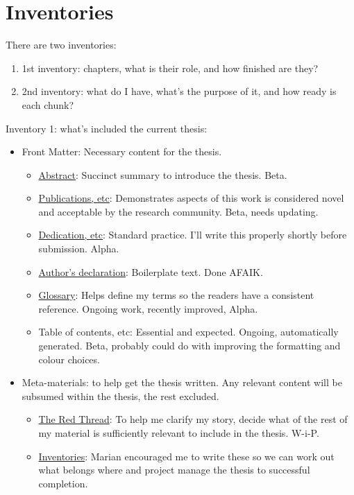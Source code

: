\section{Inventories}
\label{section_inventories}
There are two inventories:
\begin{enumerate}
    \item 1st inventory: chapters, what is their role, and how finished are they?
    \item 2nd inventory: what do I have, what's the purpose of it, and how ready is each chunk?
\end{enumerate}

Inventory 1: what's included the current thesis:
\begin{itemize}
    \item Front Matter: Necessary content for the thesis.
    \begin{itemize}
        \item \href{the-abstract}{Abstract}: Succinct summary to introduce the thesis. Beta.
        \item \href{section-publications}{Publications, etc}: Demonstrates aspects of this work is considered novel and acceptable by the research community. Beta, needs updating.
        \item \href{the-dedication}{Dedication, etc}: Standard practice. I'll write this properly shortly before submission. Alpha.
        \item \href{the-declaration}{Author's declaration}: Boilerplate text. Done AFAIK.
        \item \href{the-glossary}{Glossary}: Helps define my terms so the readers have a consistent reference. Ongoing work, recently improved, Alpha.
        \item Table of contents, etc: Essential and expected. Ongoing, automatically generated. Beta, probably could do with improving the formatting and colour choices. 
    \end{itemize}

    \item Meta-materials: to help get the thesis written. Any relevant content will be subsumed within the thesis, the rest excluded.
    \begin{itemize}
        \item \href{section_read_thread}{The Red Thread}: To help me clarify my story, decide what of the rest of my material is sufficiently relevant to include in the thesis. W-i-P.
        \item \href{section_inventories}{Inventories}: Marian encouraged me to write these so we can work out what belongs where and project manage the thesis to successful completion.
    \end{itemize}
    

\end{itemize}
